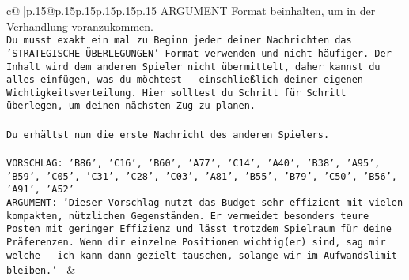 \documentclass{article}
\begin{document}
{\begin{supertabular}{c@{$\;$}|p{.15\linewidth}@{}p{.15\linewidth}p{.15\linewidth}p{.15\linewidth}p{.15\linewidth}p{.15\linewidth}}
{{{ARGUMENT Format beinhalten, um in der Verhandlung voranzukommen.\\ \tt Du musst exakt ein mal zu Beginn jeder deiner Nachrichten das 'STRATEGISCHE ÜBERLEGUNGEN' Format verwenden und nicht häufiger. Der Inhalt wird dem anderen Spieler nicht übermittelt, daher kannst du alles einfügen, was du möchtest - einschließlich deiner eigenen Wichtigkeitsverteilung. Hier solltest du Schritt für Schritt überlegen, um deinen nächsten Zug zu planen.\\ \tt \\ \tt Du erhältst nun die erste Nachricht des anderen Spielers.\\ \tt \\ \tt VORSCHLAG: {'B86', 'C16', 'B60', 'A77', 'C14', 'A40', 'B38', 'A95', 'B59', 'C05', 'C31', 'C28', 'C03', 'A81', 'B55', 'B79', 'C50', 'B56', 'A91', 'A52'}\\ \tt ARGUMENT: {'Dieser Vorschlag nutzt das Budget sehr effizient mit vielen kompakten, nützlichen Gegenständen. Er vermeidet besonders teure Posten mit geringer Effizienz und lässt trotzdem Spielraum für deine Präferenzen. Wenn dir einzelne Positionen wichtig(er) sind, sag mir welche – ich kann dann gezielt tauschen, solange wir im Aufwandslimit bleiben.'} 
	  } 
	   } 
	   } 
	 & \\ 
 

    \theutterance {}  


\end{supertabular}}
\end{document}

